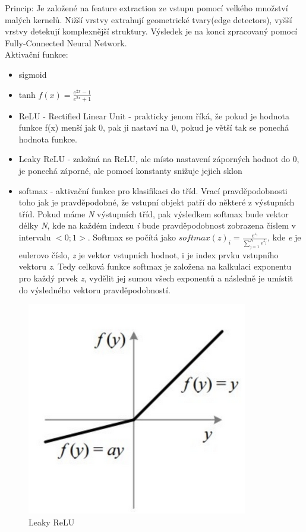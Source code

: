 Princip: Je založené na feature extraction ze vstupu pomocí velkého množství malých kernelů. Nižší vrstvy extrahují geometrické tvary(edge detectors), vyšší vrstvy detekují komplexnější struktury. Výsledek je na konci zpracovaný pomocí Fully-Connected Neural Network.\\
Aktivační funkce:
\begin{itemize}
    \item sigmoid
    \item tanh \(f(x) = \frac{e^{2x}-1}{e^{2x}+1}\)
    \item ReLU - Rectified Linear Unit - prakticky jenom říká, že pokud je hodnota funkce f(x) menší jak 0, pak ji nastaví na 0, pokud je větší tak se ponechá hodnota funkce.
    \item Leaky ReLU - založná na ReLU, ale místo nastavení záporných hodnot do 0, je ponechá záporné, ale pomocí konstanty snižuje jejich sklon
    \item softmax - aktivační funkce pro klasifikaci do tříd. Vrací pravděpodobnosti toho jak je pravděpodobné, že vstupní objekt patří do některé z výstupních tříd. Pokud máme \textit{N} výstupních tříd, pak výsledkem softmax bude vektor délky \textit{N}, kde na každém indexu \textit{i} bude pravděpodobnost  zobrazena číslem v intervalu \(<0;1>\). Softmax se počítá jako \(softmax(z)_i = \frac{e^{z_i}}{\sum_{j = 1}^{N}e^{z_j}}\), kde \textit{e} je eulerovo číslo, \textit{z} je vektor vstupních hodnot, i je index prvku vstupního vektoru \textit{z}. Tedy celková funkce softmax je založena na kalkulaci exponentu pro každý prvek \textit{z}, vydělit jej sumou všech exponentů a následně je umístit do výsledného vektoru pravděpodobností.\\
\end{itemize}
\begin{figure}[h!]
    \centering
    \includegraphics[scale = 0.3]{images/LeakyReLU.png}
    \caption{Leaky ReLU}
\end{figure}

